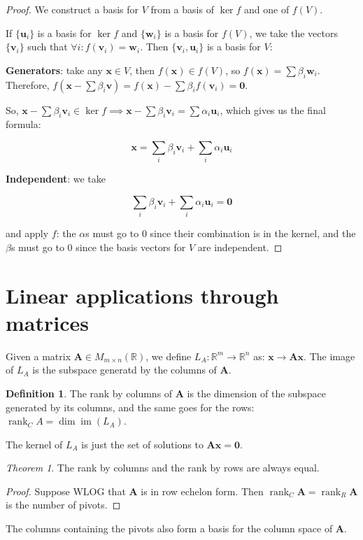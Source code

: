 \documentclass[12pt,a4paper]{report}
\numberwithin{equation}{section}
\theoremstyle{definition}
\newtheorem{definition}{Definition}[section]
\theoremstyle{remark}
\newtheorem{theorem}{Theorem}[section]
\DeclareMathOperator{\rank}{rank}
\DeclareMathOperator{\im}{im}
\begin{document}
\begin{proof}
We construct a basis for $V$ from a basis of $\ker f$ and one of $f(V)$.

If $\lbrace \mathbf{u}_i \rbrace$ is a basis for $\ker f$ and $\lbrace\mathbf{w}_i \rbrace $ is a basis for $f(V)$, we take the vectors $\lbrace \mathbf{v}_i \rbrace$ such that $\forall i: f(\mathbf{v}_i) = \mathbf{w}_i$. Then $\lbrace \mathbf{v}_i , \mathbf{u}_i \rbrace$ is a basis for $V$:


\textbf{Generators}: take any $\mathbf{x} \in V$, then $f(\mathbf{x}) \in f(V)$, so $f(\mathbf{x}) = \sum \beta_i \mathbf{w}_i$. Therefore, $f(\mathbf{x} - \sum \beta_i \mathbf{v} ) = f(\mathbf{x}) - \sum \beta_i f(\mathbf{v}_i) = \mathbf{0}$.

So, $\mathbf{x} - \sum \beta_i \mathbf{v}_i \in \ker f \implies \mathbf{x} - \sum \beta_i \mathbf{v}_i = \sum \alpha_i \mathbf{u}_i$, which gives us the final formula:

\begin{equation}
\mathbf{x} = \sum_i \beta_i \mathbf{v}_i + \sum_i \alpha_i \mathbf{u}_i
\end{equation}

\textbf{Independent}: we take

\begin{equation}
\sum_i \beta_i \mathbf{v}_i + \sum_i \alpha_i \mathbf{u}_i = \mathbf{0}
\end{equation}

and apply $f$: the $\alpha$s must go to 0 since their combination is in the kernel, and the $\beta$s must go to 0 since the basis vectors for $V$ are independent.
\end{proof}

\section{Linear applications through matrices}

Given a matrix $\mathbf{A} \in M_{m\times n} (\mathbb{R})$, we define $L_A: \mathbb{R}^m \rightarrow \mathbb{R}^n$ as: $\mathbf{x} \rightarrow \mathbf{Ax}$. The image of $L_A$ is the subspace generatd by the columns of $\mathbf{A}$.

\begin{definition}
The rank by columns of $\mathbf{A}$ is the dimension of the subspace generated by its columns, and the same goes for the rows: $\rank_C A = \dim \im(L_A)$.
\end{definition}

The kernel of $L_A$ is just the set of solutions to $\mathbf{Ax} = \mathbf{0}$.

\begin{theorem}
The rank by columns and the rank by rows are always equal.
\end{theorem}

\begin{proof}
Suppose WLOG that $\mathbf{A}$ is in row echelon form. Then $\rank_C \mathbf{A} = \rank _R \mathbf{A}$ is the number of pivots.
\end{proof}

The columns containing the pivots also form a basis for the column space of $\mathbf{A}$.

\tableofcontents
\end{document}
